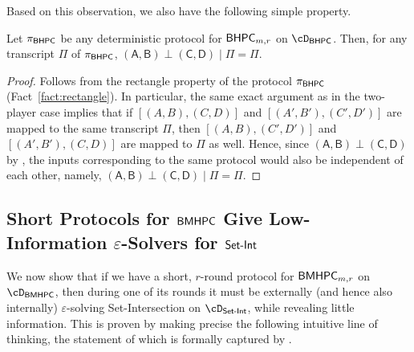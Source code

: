 \documentclass[11pt,letterpaper]{article}
\newcommand{\eps}{\varepsilon}
\theoremstyle{definition}
\newcommand{\rPi}{\rv{\Pi}}
\newcommand{\bhpc}{\ensuremath{\textnormal{\textsf{BHPC}}}\xspace}
\newcommand{\bmhpc}{\ensuremath{\textnormal{\textsf{BMHPC}}}\xspace}
\newcommand{\Prot}{\ensuremath{\Pi}}
\newcommand{\prot}{\ensuremath{\pi}}
\newcommand{\rA}{\rv{A}}
\newcommand{\rB}{\rv{B}}
\newcommand{\rC}{\rv{C}}
\newcommand{\rD}{\rv{D}}
\newcommand{\rv}[1]{\ensuremath{\mathsf{#1}}}
\newcommand{\SI}{\ensuremath{\textnormal{\textsf{Set-Int}}}\xspace}
\begin{document}
Based on this observation, we also have the following simple property. 

\begin{proposition}\label{prop:hpc-rectangle}
  Let $\prot_\bhpc$ be any deterministic protocol for $\bhpc_{m,r}$ on
  $\cD_\bhpc$.
  Then, for any transcript $\Prot$ of $\prot_\bhpc$, $(\rA,\rB)
  \perp (\rC,\rD) \mid \rPi = \Prot$. 
\end{proposition}
\begin{proof}
  Follows from the rectangle property of the protocol $\prot_\bhpc$
  (Fact~\ref{fact:rectangle}).
  In particular, the same exact argument as in the two-player case implies that
  if $[(A, B),(C, D)]$ and $[(A', B'),(C', D')]$ are mapped to the same
  transcript $\Prot$, then $[(A, B),(C', D')]$ and $[(A', B'),(C, D)]$ are
  mapped to $\Prot$ as well.
  Hence, since $(\rA, \rB) \perp (\rC,\rD)$ by , the
  inputs corresponding to the same protocol would also be independent of each
  other, namely, $(\rA, \rB) \perp (\rC, \rD) \mid \rPi = \Prot$. 
\end{proof}







\subsection{\texorpdfstring{Short Protocols for $\bmhpc$ Give Low-Information $\eps$-Solvers for $\SI$}{Short Protocols for BMHCP Give Low-Information eps-Solvers for Set Intersection}}\label{sec:eps-solving-to-mhpc}

We now show that if we have a short, $r$-round protocol for $\bmhpc_{m,r}$ on $\cD_\bmhpc$, then during one of its rounds it must be externally (and hence also internally) $\eps$-solving Set-Intersection on $\cD_\SI$, while revealing little information. This is proven by making precise the following intuitive line of thinking, the statement of which is formally captured by . 
\end{document}
